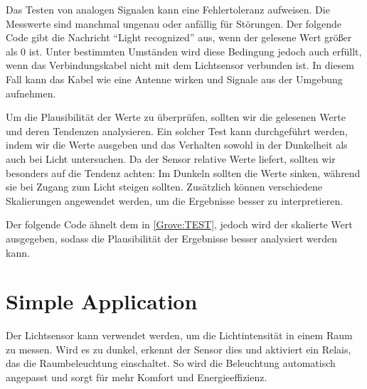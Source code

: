 Das Testen von analogen Signalen kann eine Fehlertoleranz aufweisen. Die Messwerte sind manchmal ungenau oder anfällig für Störungen. Der folgende Code gibt die Nachricht ``Light recognized'' aus, wenn der gelesene Wert größer als 0 ist. Unter bestimmten Umständen wird diese Bedingung jedoch auch erfüllt, wenn das Verbindungskabel nicht mit dem Lichtsensor verbunden ist. In diesem Fall kann das Kabel wie eine Antenne wirken und Signale aus der Umgebung aufnehmen.

{
	\label{Grove:TEST}
	
}

Um die Plausibilität der Werte zu überprüfen, sollten wir die gelesenen Werte und deren Tendenzen analysieren. Ein solcher Test kann durchgeführt werden, indem wir die Werte ausgeben und das Verhalten sowohl in der Dunkelheit als auch bei Licht untersuchen. Da der Sensor relative Werte liefert, sollten wir besonders auf die Tendenz achten: Im Dunkeln sollten die Werte sinken, während sie bei Zugang zum Licht steigen sollten. Zusätzlich können verschiedene Skalierungen angewendet werden, um die Ergebnisse besser zu interpretieren.

Der folgende Code ähnelt dem in \ref{Grove:TEST}, jedoch wird der skalierte Wert ausgegeben, sodass die Plausibilität der Ergebnisse besser analysiert werden kann. 

{
	\label{Grove:TEST_Plaus}
	
}


\section{Simple Application}
Der Lichtsensor kann verwendet werden, um die Lichtintensität in einem Raum zu messen. Wird es zu dunkel, erkennt der Sensor dies und aktiviert ein Relais, das die Raumbeleuchtung einschaltet. So wird die Beleuchtung automatisch angepasst und sorgt für mehr Komfort und Energieeffizienz.

